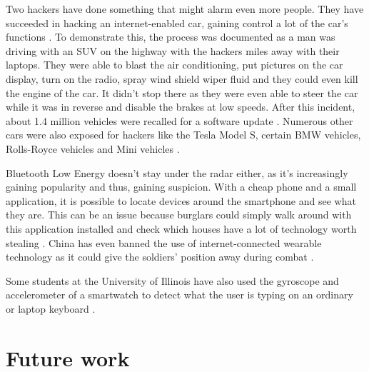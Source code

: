 \documentclass[pdftex,a4paper,12pt,twoside]{report}
\begin{document}
Two hackers have done something that might alarm even more people. They have succeeded in hacking an internet-enabled car, gaining control a lot of the car's functions \citep{greenberg2015}. To demonstrate this, the process was documented as a man was driving with an SUV on the highway with the hackers miles away with their laptops. They were able to blast the air conditioning, put pictures on the car display, turn on the radio, spray wind shield wiper fluid and they could even kill the engine of the car. It didn't stop there as they were even able to steer the car while it was in reverse and disable the brakes at low speeds. After this incident, about 1.4 million vehicles were recalled for a software update \citep{kessler2015}. Numerous other cars were also exposed for hackers like the Tesla Model S, certain BMW vehicles, Rolls-Royce vehicles and Mini vehicles \citep{hirsch2015}.

Bluetooth Low Energy doesn't stay under the radar either, as it's increasingly gaining popularity and thus, gaining suspicion. With a cheap phone and a small application, it is possible to locate devices around the smartphone and see what they are. This can be an issue because burglars could simply walk around with this application installed and check which houses have a lot of technology worth stealing \citep{ashford2015}. China has even banned the use of internet-connected wearable technology as it could give the soldiers' position away during combat \citep{bbcnews2015}.

Some students at the University of Illinois have also used the gyroscope and accelerometer of a smartwatch to detect what the user is typing on an ordinary or laptop keyboard \citep{iyer2015, wang2015mole}.

\section{Future work}
\label{sec:futurework}








\listoffigures
\listoftables
\end{document}
